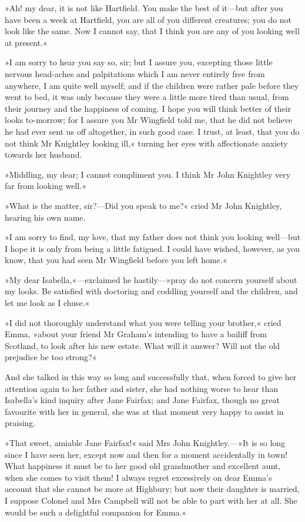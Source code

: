 »Ah! my dear, it is not like Hartfield. You make the best of it—but after you have been a week at Hartfield, you are all of you different creatures; you do not look like the same. Now I cannot say, that I think you are any of you looking well at present.«

»I am sorry to hear you say so, sir; but I assure you, excepting those little nervous head-aches and palpitations which I am never entirely free from anywhere, I am quite well myself; and if the children were rather pale before they went to bed, it was only because they were a little more tired than usual, from their journey and the happiness of coming. I hope you will think better of their looks to-morrow; for I assure you Mr Wingfield told me, that he did not believe he had ever sent us off altogether, in such good case. I trust, at least, that you do not think Mr Knightley looking ill,« turning her eyes with affectionate anxiety towards her husband.

»Middling, my dear; I cannot compliment you. I think Mr John Knightley very far from looking well.«

»What is the matter, sir?—Did you speak to me?« cried Mr John Knightley, hearing his own name.

»I am sorry to find, my love, that my father does not think you looking well—but I hope it is only from being a little fatigued. I could have wished, however, as you know, that you had seen Mr Wingfield before you left home.«

»My dear Isabella,«—exclaimed he hastily—»pray do not concern yourself about my looks. Be satisfied with doctoring and coddling yourself and the children, and let me look as I chuse.«

»I did not thoroughly understand what you were telling your brother,« cried Emma, »about your friend Mr Graham's intending to have a bailiff from Scotland, to look after his new estate. What will it answer? Will not the old prejudice be too strong?«

And she talked in this way so long and successfully that, when forced to give her attention again to her father and sister, she had nothing worse to hear than Isabella's kind inquiry after Jane Fairfax; and Jane Fairfax, though no great favourite with her in general, she was at that moment very happy to assist in praising.

»That sweet, amiable Jane Fairfax!« said Mrs John Knightley.—»It is so long since I have seen her, except now and then for a moment accidentally in town! What happiness it must be to her good old grandmother and excellent aunt, when she comes to visit them! I always regret excessively on dear Emma's account that she cannot be more at Highbury; but now their daughter is married, I suppose Colonel and Mrs Campbell will not be able to part with her at all. She would be such a delightful companion for Emma.«

